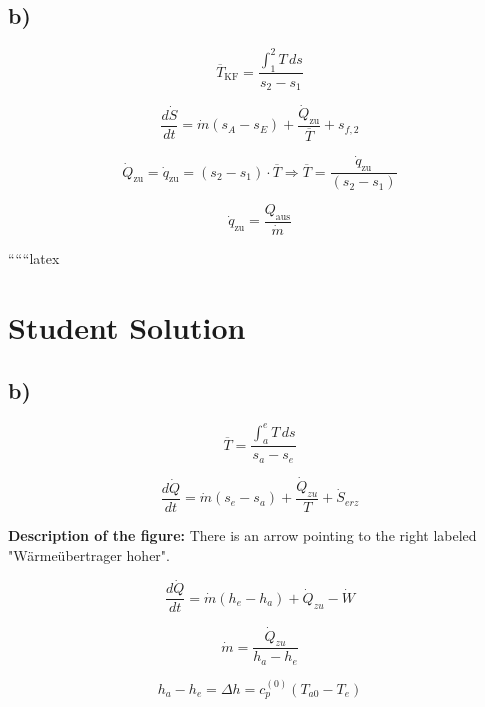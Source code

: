 

\subsection*{b)}

\[
\overline{T}_{\text{KF}} = \frac{\int_1^2 T \, ds}{s_2 - s_1}
\]

\[
\frac{d\dot{S}}{dt} = \dot{m} (s_A - s_E) + \frac{\dot{Q}_{\text{zu}}}{\overline{T}} + s_{f,2}
\]

\[
\dot{Q}_{\text{zu}} = \dot{q}_{\text{zu}} = (s_2 - s_1) \cdot \overline{T} \Rightarrow \overline{T} = \frac{\dot{q}_{\text{zu}}}{(s_2 - s_1)}
\]

\[
\dot{q}_{\text{zu}} = \frac{Q_{\text{aus}}}{\dot{m}}
\]

``````latex


\section*{Student Solution}



\subsection*{b)}

\[
\overline{T} = \frac{\int_{a}^{e} T \, ds}{s_a - s_e}
\]

\[
\frac{d\dot{Q}}{dt} = \dot{m} (s_e - s_a) + \frac{\dot{Q}_{zu}}{T} + \dot{S}_{erz}
\]

\textbf{Description of the figure:} There is an arrow pointing to the right labeled "Wärmeübertrager hoher".

\[
\frac{d\dot{Q}}{dt} = \dot{m} (h_e - h_a) + \dot{Q}_{zu} - \dot{W}
\]

\[
\dot{m} = \frac{\dot{Q}_{zu}}{h_a - h_e}
\]

\[
h_a - h_e = \Delta h = c_p^{(0)} (T_{a0} - T_e)
\]